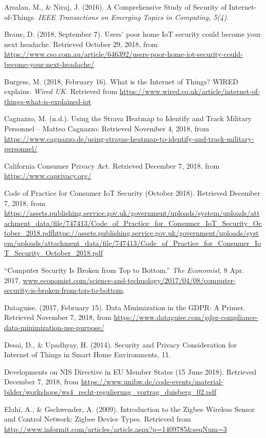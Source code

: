 \begin{hangparas}{2em}{1}
Arsalan, M., \& Niraj, J. (2016). A Comprehensive Study of Security of Internet-of-Things. \textit{IEEE Transactions on Emerging Topics in Computing, 5(4).}

Braue, D. (2018, September 7). Users’ poor home IoT security could become your next headache. Retrieved October 29, 2018, from \url{https://www.cso.com.au/article/646392/users-poor-home-iot-security-could-become-your-next-headache/}

Burgess, M. (2018, February 16). What is the Internet of Things? WIRED explains. \textit{Wired UK.} Retrieved from \url{https://www.wired.co.uk/article/internet-of-things-what-is-explained-iot}

Cagnazzo, M. (n.d.). Using the Strava Heatmap to Identify and Track Military Personnel – Matteo Cagnazzo. Retrieved November 4, 2018, from \url{https://www.cagnazzo.de/using-stravas-heatmap-to-identify-and-track-military-personnel/}

California Consumer Privacy Act. Retrieved December 7, 2018, from \url{https://www.caprivacy.org/}

Code of Practice for Consumer IoT Security (October 2018). Retrieved December 7, 2018, from \url{https://assets.publishing.service.gov.uk/government/uploads/system/uploads/attachment_data/file/747413/Code_of_Practice_for_Consumer_IoT_Security_October_2018.pdfhttps://assets.publishing.service.gov.uk/government/uploads/system/uploads/attachment_data/file/747413/Code_of_Practice_for_Consumer_IoT_Security_October_2018.pdf}

“Computer Security Is Broken from Top to Bottom.” \textit{The Economist}, 8 Apr. 2017, \url{www.economist.com/science-and-technology/2017/04/08/computer-security-is-broken-from-top-to-bottom}. 

Dataguise. (2017, February 15). Data Minimization in the GDPR: A Primer. Retrieved November 7, 2018, from \url{https://www.dataguise.com/gdpr-compliance-data-minimization-use-purpose/}

Desai, D., \& Upadhyay, H. (2014). Security and Privacy Consideration for Internet of Things in Smart Home Environments, 11.

Developments on NIS Directive in EU Member States (15 June 2018). Retrieved December 7, 2018, from \url{https://www.unibw.de/code-events/material-bilder/workshops/ws4_recht-regulierung_vortrag_duisberg_02.pdf}

Elahi, A., \& Gschwender, A. (2009). Introduction to the Zigbee Wireless Sensor and Control Network: Zigbee Device Types. Retrieved from \url{http://www.informit.com/articles/article.aspx?p=1409785\&seqNum=3}


\end{hangparas}
